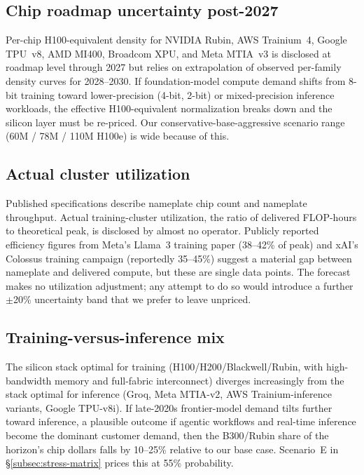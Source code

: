 \documentclass[11pt,a4paper]{article}
\begin{document}
\subsection{Chip roadmap uncertainty post-2027}

Per-chip H100-equivalent density for NVIDIA Rubin, AWS Trainium~4, Google TPU~v8, AMD MI400, Broadcom XPU, and Meta MTIA~v3 is disclosed at roadmap level through 2027 but relies on extrapolation of observed per-family density curves for 2028--2030. If foundation-model compute demand shifts from 8-bit training toward lower-precision (4-bit, 2-bit) or mixed-precision inference workloads, the effective H100-equivalent normalization breaks down and the silicon layer must be re-priced. Our conservative-base-aggressive scenario range (60M / 78M / 110M H100e) is wide because of this.

\subsection{Actual cluster utilization}

Published specifications describe nameplate chip count and nameplate throughput. Actual training-cluster utilization, the ratio of delivered FLOP-hours to theoretical peak, is disclosed by almost no operator. Publicly reported efficiency figures from Meta's Llama~3 training paper (38--42\% of peak) and xAI's Colossus training campaign (reportedly 35--45\%) suggest a material gap between nameplate and delivered compute, but these are single data points. The forecast makes no utilization adjustment; any attempt to do so would introduce a further $\pm$20\% uncertainty band that we prefer to leave unpriced.

\subsection{Training-versus-inference mix}

The silicon stack optimal for training (H100/H200/Blackwell/Rubin, with high-bandwidth memory and full-fabric interconnect) diverges increasingly from the stack optimal for inference (Groq, Meta MTIA-v2, AWS Trainium-inference variants, Google TPU-v8i). If late-2020s frontier-model demand tilts further toward inference, a plausible outcome if agentic workflows and real-time inference become the dominant customer demand, then the B300/Rubin share of the horizon's chip dollars falls by 10--25\% relative to our base case. Scenario~E in \S\ref{subsec:stress-matrix} prices this at 55\% probability.
\end{document}
